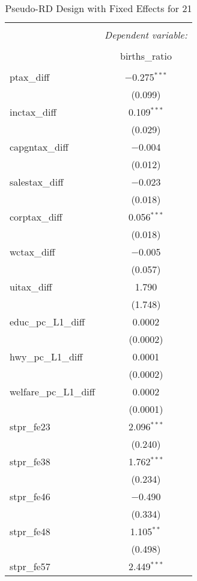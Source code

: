 
\begin{table}[!htbp] \centering 
  \caption{Pseudo-RD Design with Fixed Effects for  21} 
  \label{} 
\begin{tabular}{@{\extracolsep{5pt}}lc} 
\\[-1.8ex]\hline 
\hline \\[-1.8ex] 
 & \multicolumn{1}{c}{\textit{Dependent variable:}} \\ 
\cline{2-2} 
\\[-1.8ex] & births\_ratio \\ 
\hline \\[-1.8ex] 
 ptax\_diff & $-$0.275$^{***}$ \\ 
  & (0.099) \\ 
  inctax\_diff & 0.109$^{***}$ \\ 
  & (0.029) \\ 
  capgntax\_diff & $-$0.004 \\ 
  & (0.012) \\ 
  salestax\_diff & $-$0.023 \\ 
  & (0.018) \\ 
  corptax\_diff & 0.056$^{***}$ \\ 
  & (0.018) \\ 
  wctax\_diff & $-$0.005 \\ 
  & (0.057) \\ 
  uitax\_diff & 1.790 \\ 
  & (1.748) \\ 
  educ\_pc\_L1\_diff & 0.0002 \\ 
  & (0.0002) \\ 
  hwy\_pc\_L1\_diff & 0.0001 \\ 
  & (0.0002) \\ 
  welfare\_pc\_L1\_diff & 0.0002 \\ 
  & (0.0001) \\ 
  stpr\_fe23 & 2.096$^{***}$ \\ 
  & (0.240) \\ 
  stpr\_fe38 & 1.762$^{***}$ \\ 
  & (0.234) \\ 
  stpr\_fe46 & $-$0.490 \\ 
  & (0.334) \\ 
  stpr\_fe48 & 1.105$^{**}$ \\ 
  & (0.498) \\ 
  stpr\_fe57 & 2.449$^{***}$ \\ 

\end{tabular}
\end{table}
